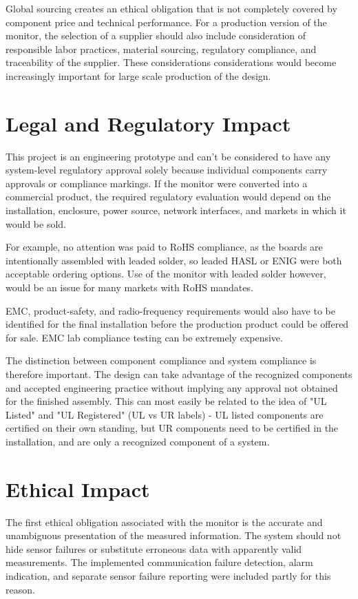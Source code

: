 Global sourcing creates an ethical obligation that is not completely covered by component price and technical performance. For a production version of the monitor, the selection of a supplier should also include consideration of responsible labor practices, material sourcing, regulatory compliance, and traceability of the supplier. These considerations considerations would become increasingly important for large scale production of the design.

\section{Legal and Regulatory Impact}

This project is an engineering prototype and can't be considered to have any system-level regulatory approval solely because individual components
carry approvals or compliance markings. If the monitor were converted into a commercial product, the required regulatory evaluation would depend on the installation, enclosure, power source, network interfaces, and markets
in which it would be sold.

For example, no attention was paid to RoHS compliance, as the boards are intentionally assembled with leaded solder, so leaded HASL or ENIG were both acceptable ordering options. Use of the monitor with leaded solder however, would be an issue for many markets with RoHS mandates.

EMC, product-safety, and radio-frequency requirements would also have to be identified for the final installation before the production product could be offered for sale. EMC lab compliance testing can be extremely expensive.

The distinction between component compliance and system compliance is therefore important. The design can take advantage of the recognized components and accepted engineering practice without implying any approval not obtained for the finished assembly. This can most easily be related to the idea of "UL Listed" and "UL Registered" (UL vs UR labels) - UL listed components are certified on their own standing, but UR components need to be certified in the installation, and are only a recognized component of a system.

\section{Ethical Impact}

The first ethical obligation associated with the monitor is the accurate and
unambiguous presentation of the measured information. The system should not hide
sensor failures or substitute erroneous data with apparently valid measurements. The implemented communication failure detection, alarm indication, and separate sensor failure reporting were included partly for this reason.


